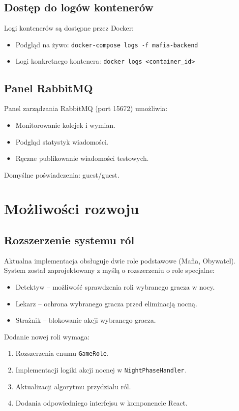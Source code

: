 ﻿\documentclass[a4paper,twoside,11pt]{mwrep}
\theoremstyle{plain} \newtheorem{thm}{Twierdzenie}
\theoremstyle{plain} \newtheorem{lem}{Lemat}
\theoremstyle{definition} \newtheorem{defn}{Definicja}
\theoremstyle{remark} \newtheorem*{rem}{Wniosek}
\begin{document}
\subsection{Dostęp do logów kontenerów}

Logi kontenerów są dostępne przez Docker:
\begin{itemize}
    \item Podgląd na żywo: \texttt{docker-compose logs -f mafia-backend}
    \item Logi konkretnego kontenera: \texttt{docker logs <container\_id>}
\end{itemize}

\subsection{Panel RabbitMQ}

Panel zarządzania RabbitMQ (port 15672) umożliwia:
\begin{itemize}
    \item Monitorowanie kolejek i wymian.
    \item Podgląd statystyk wiadomości.
    \item Ręczne publikowanie wiadomości testowych.
\end{itemize}

Domyślne poświadczenia: guest/guest.

\section{Możliwości rozwoju}

\subsection{Rozszerzenie systemu ról}

Aktualna implementacja obsługuje dwie role podstawowe (Mafia, Obywatel). System został zaprojektowany z myślą o rozszerzeniu o role specjalne:
\begin{itemize}
    \item Detektyw -- możliwość sprawdzenia roli wybranego gracza w nocy.
    \item Lekarz -- ochrona wybranego gracza przed eliminacją nocną.
    \item Strażnik -- blokowanie akcji wybranego gracza.
\end{itemize}

Dodanie nowej roli wymaga:
\begin{enumerate}
    \item Rozszerzenia enumu \texttt{GameRole}.
    \item Implementacji logiki akcji nocnej w \texttt{NightPhaseHandler}.
    \item Aktualizacji algorytmu przydziału ról.
    \item Dodania odpowiedniego interfejsu w komponencie React.
\end{enumerate}
\end{document}
